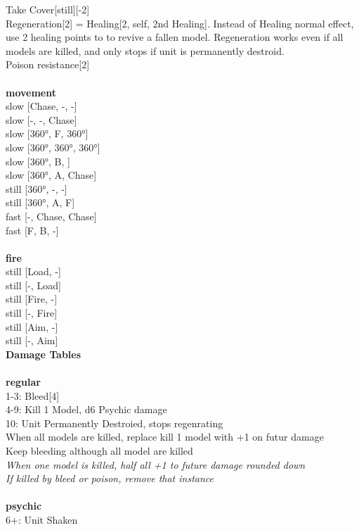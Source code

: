 \noindent Take Cover[still][-2]\\ 
Regeneration[2] = Healing[2, self, 2nd Healing]. Instead of Healing normal effect, use 2 healing points to to revive a fallen model. Regeneration works even if all models are killed, and only stops if unit is permanently destroid.\\ 
Poison resistance[2]\\ 


\ \\ {\bf movement } \\
slow [Chase, -, -] \\
slow [-, -, Chase] \\
slow [360°, F, 360°] \\
slow [360°, 360°, 360°] \\
slow [360°, B, ] \\
slow [360°, A, Chase] \\
still [360°, -, -] \\
still [360°, A, F] \\
fast [-, Chase, Chase] \\
fast [F, B, -] \\
\ \\ {\bf fire } \\
still [Load, -] \\
still [-, Load] \\
still [Fire, -] \\
still [-, Fire] \\
still [Aim, -] \\
still [-, Aim] \\


{\bf Damage Tables} \\
\ \\ {\bf regular } \\
1-3: Bleed[4] \\
4-9: Kill 1 Model, d6 Psychic damage \\
10: Unit Permanently Destroied, stops regenrating \\
When all models are killed, replace kill 1 model with +1 on futur damage \\
Keep bleeding although all model are killed \\
{{\it When one model is killed, half all +1 to future damage rounded down}} \\
{{\it If killed by bleed or poison, remove that instance}} \\
\ \\ {\bf psychic } \\
6+: Unit Shaken \\


